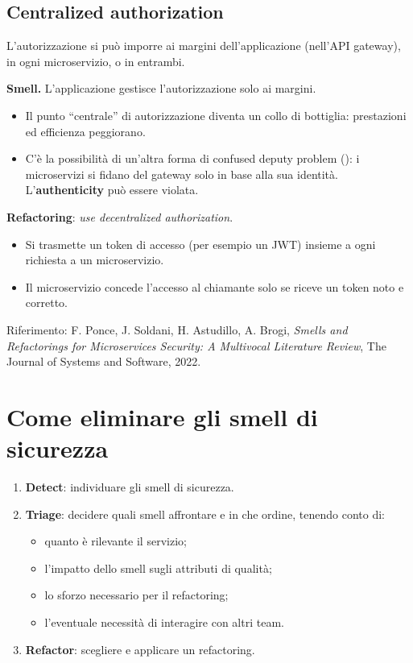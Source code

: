 \subsection{Centralized authorization}

L'autorizzazione si può imporre ai margini dell'applicazione (nell'API gateway), in ogni microservizio, o in entrambi.

\textbf{Smell.} L'applicazione gestisce l'autorizzazione solo ai margini.
\begin{itemize}
  \item Il punto ``centrale'' di autorizzazione diventa un collo di bottiglia: prestazioni ed efficienza peggiorano.
  \item C'è la possibilità di un'altra forma di confused deputy problem (): i microservizi si
    fidano del gateway solo in base alla sua identità. L'\textbf{authenticity} può essere violata.
\end{itemize}

\textbf{Refactoring}: \emph{use decentralized authorization}.
\begin{itemize}
  \item Si trasmette un token di accesso (per esempio un JWT) insieme a ogni richiesta a un microservizio.
  \item Il microservizio concede l'accesso al chiamante solo se riceve un token noto e corretto.
\end{itemize}

Riferimento: F. Ponce, J. Soldani, H. Astudillo, A. Brogi, \emph{Smells and Refactorings for Microservices Security:
A Multivocal Literature Review}, The Journal of Systems and Software, 2022.

\section{Come eliminare gli smell di sicurezza}
\label{sec:secm-eliminare}

\begin{algoritmo}
\begin{enumerate}
  \item \textbf{Detect}: individuare gli smell di sicurezza.
  \item \textbf{Triage}: decidere quali smell affrontare e in che ordine, tenendo conto di:
    \begin{itemize}
      \item quanto è rilevante il servizio;
      \item l'impatto dello smell sugli attributi di qualità;
      \item lo sforzo necessario per il refactoring;
      \item l'eventuale necessità di interagire con altri team.
    \end{itemize}
  \item \textbf{Refactor}: scegliere e applicare un refactoring.
\end{enumerate}
\end{algoritmo}

